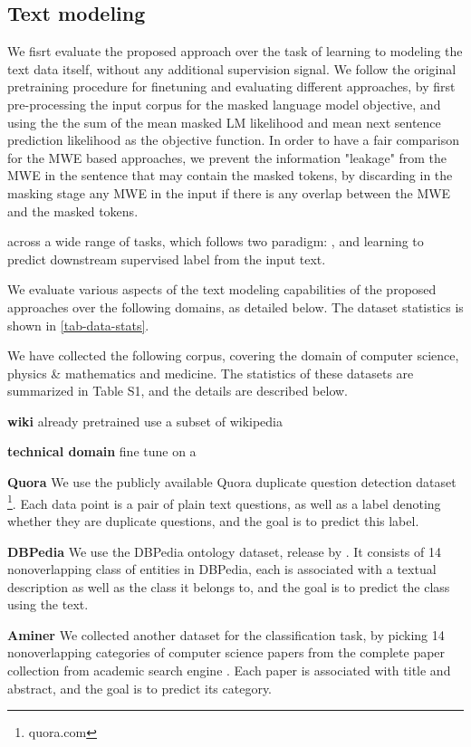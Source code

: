 \subsection{Text modeling} \label{sec:dataset}
We fisrt evaluate the proposed approach over the task of 
learning to modeling the text data itself, without any additional supervision signal.
We follow the original pretraining procedure for finetuning and evaluating different approaches,
by first pre-processing the input corpus for the masked language model objective, and using the the sum of the mean masked LM likelihood and mean next sentence prediction likelihood as the objective function. 
In order to have a fair comparison for the MWE based approaches, we prevent the information "leakage" from the MWE in the sentence that may contain the masked tokens, by discarding in the masking stage any MWE in the input if there is any overlap between the MWE and the masked tokens.


across a wide range of tasks, which follows two paradigm: 
, and learning to predict downstream supervised label from the input text. 



We evaluate various aspects of the text modeling capabilities of the proposed approaches over the following domains, as detailed below. The dataset statistics is shown in \autoref{tab-data-stats}. 


We have collected the following corpus, covering the domain of computer science, physics \& mathematics and medicine.
The statistics of these datasets are summarized in Table S1, and the details are described below.

\noindent \textbf{wiki}
already pretrained
use a subset of wikipedia


\noindent \textbf{technical domain}
fine tune on a


\noindent \textbf{Quora} We use the publicly available Quora duplicate question detection dataset \footnote{quora.com}. Each data point is a pair of plain text questions, as well as a label denoting whether they are duplicate questions, and the goal is to predict this label.

\noindent \textbf{DBPedia}
We use the DBPedia ontology dataset, release by \cite{zhang2015character}. 
It consists of 14 nonoverlapping class of entities in DBPedia, each is associated with a textual description as well as the class it belongs to, and the goal is to predict the class using the text.

\noindent \textbf{Aminer}
We collected another dataset for the classification task, by picking 14 nonoverlapping categories of computer science papers from the complete paper collection from academic search engine \cite{Tang08KDD}. Each paper is associated with title and abstract, and the goal is to predict its category.



